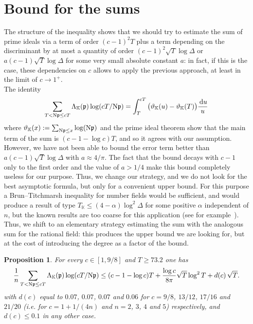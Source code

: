 \documentclass[a4paper,11pt]{amsart}
\newcommand{\field}[1]{\mathbb{{#1}}}
\newcommand{\ideal}[1]{\mathfrak{{#1}}}
\newcommand{\K}{\field{{K}}}
\newcommand{\p}{\ideal{p}}
\newcommand{\Norm}{\textrm{\upshape N}}
\newcommand{\dd}{\,\mathrm{d}}
\newtheorem{proposition}{Proposition}
\theoremstyle{remark}
\begin{document}
\section{Bound for the sums}\label{sec:3A}
The structure of the inequality shows that we should try to estimate the sum of prime ideals via a term
of order $(c-1)^2T$ plus a term depending on the discriminant by at most a quantity of order $(c-1)^2
\sqrt{T} \log\Delta$ or $a(c-1)\sqrt{T}\log\Delta$ for some very small absolute constant $a$: in fact,
if this is the case, these dependencies on $c$ allows to apply the previous approach, at least in the
limit of $c\to 1^+$.\\
%
The identity
\[
\sum_{\substack{T< \Norm\p \leq cT}} \Lambda_{\K}(\p)\log(cT/\Norm\p)
= \int_T^{cT} \big(\vartheta_\K(u) - \vartheta_\K(T)\big)\frac{\dd u}{u}
\]
where $\vartheta_\K(x):=\sum_{\Norm\p\leq x}\log(\Norm\p)$ and the prime ideal theorem show that the main
term of the sum is $(c-1-\log c)T$, and so it agrees with our assumption. However, we have not been able
to bound the error term better than $a(c-1)\sqrt{T}\log\Delta$ with $a\approx 4/\pi$. The fact that the
bound decays with $c-1$ only to the first order and the value of $a > 1/4$ make this bound completely
useless for our purpose. %
%
Thus, we change our strategy, and we do not look for the best asymptotic formula, but only for a
convenient upper bound. For this purpose a Brun--Titchmarsh inequality for number fields would be
sufficient, and would produce a result of type $T_\K\leq (4-\alpha)\log^2\Delta$ for some positive
$\alpha$ independent of $n$, but the known results are too coarse for this application (see for
example~\cite{ThornerZaman2}). Thus, we shift to an elementary strategy estimating the sum with the
analogous sum for the rational field: this produces the upper bound we are looking for, but at the cost
of introducing the degree as a factor of the bound.
%
\begin{proposition}\label{prop:1A}
For every $c\in[1,9/8]$ and $T\geq 73.2$ one has
\[
\frac{1}{n}
\sum_{\substack{T< \Norm\p \leq cT}} \Lambda_{\K}(\p)\log(cT/\Norm\p)
\leq (c-1-\log c)T + \frac{\log c}{8\pi}\sqrt{T}\log^2T + d(c)\,\sqrt{T}.
\]
with $d(c)$ equal to $0.07$, $0.07$, $0.07$ and $0.06$ for $c=9/8$, $13/12$, $17/16$ and $21/20$ (i.e.
for $c=1+1/(4n)$ and $n=2$, $3$, $4$ and $5$) respectively, and $d(c) \leq 0.1$ in any other case.
\end{proposition}
%
\end{document}
